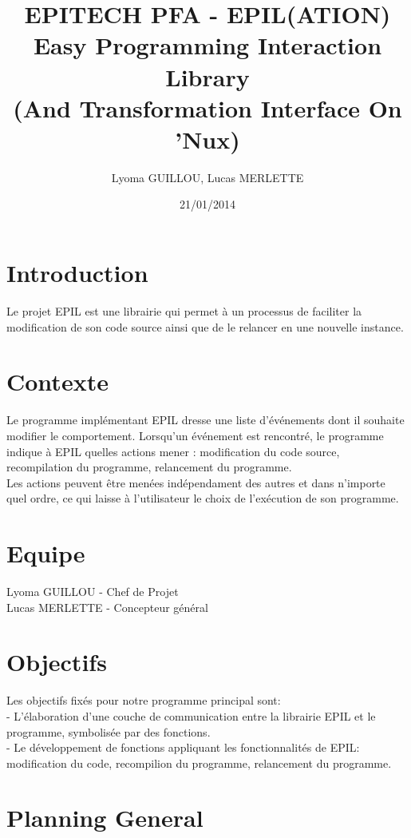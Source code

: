 \documentclass[12pt,a4paper]{article}
\title{\textbf{EPITECH PFA - EPIL}(ATION)\\
  \textbf{Easy Programming Interaction Library}\\
  (And Transformation Interface On 'Nux)}
\author{Lyoma GUILLOU, Lucas MERLETTE}
\date{21/01/2014}
\begin{document}
\maketitle

\newpage
\section{Introduction}
Le projet EPIL est une librairie qui permet \`{a} un processus de faciliter la modification de son code source ainsi que de le relancer en une nouvelle instance.

\section{Contexte}
Le programme impl\'{e}mentant EPIL dresse une liste d'\'{e}v\'{e}nements dont il souhaite modifier le comportement.
Lorsqu'un \'{e}v\'{e}nement est rencontr\'{e}, le programme indique \`{a} EPIL quelles actions mener : modification du code source, recompilation du programme, relancement du programme.\\
Les actions peuvent \^{e}tre men\'{e}es ind\'{e}pendament des autres et dans n'importe quel ordre, ce qui laisse \`{a} l'utilisateur le choix de l'ex\'{e}cution de son programme.

\newpage
\section{Equipe}
Lyoma GUILLOU - Chef de Projet\\
Lucas MERLETTE - Concepteur g\'{e}n\'{e}ral

\section{Objectifs}
Les objectifs fix\'{e}s pour notre programme principal sont:
\\- L'\'{e}laboration d'une couche de communication entre la librairie EPIL et le programme, symbolis\'{e}e par des fonctions.
\\- Le d\'{e}veloppement de fonctions appliquant les fonctionnalit\'{e}s de EPIL: modification du code, recompilion du programme, relancement du programme.

\newpage
\section{Planning General}
\end{document}
